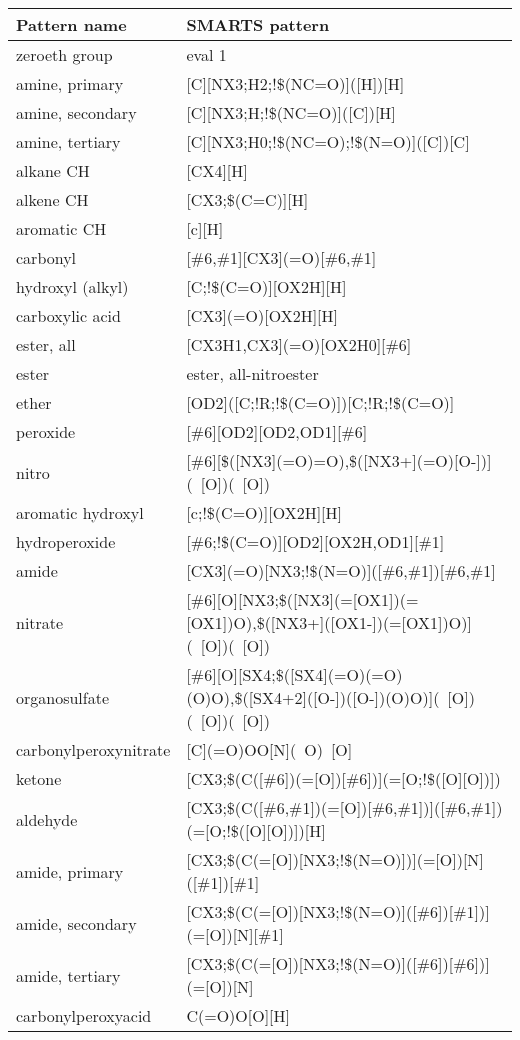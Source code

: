 \begin{tabular}{ll}
\toprule
Pattern name & SMARTS pattern \\
\midrule
zeroeth group & eval 1 \\
amine, primary & [C][NX3;H2;!\$(NC=O)]([H])[H] \\
amine, secondary & [C][NX3;H;!\$(NC=O)]([C])[H] \\
amine, tertiary & [C][NX3;H0;!\$(NC=O);!\$(N=O)]([C])[C] \\
alkane CH & [CX4][H] \\
alkene CH & [CX3;\$(C=C)][H] \\
aromatic CH & [c][H] \\
carbonyl & [\#6,\#1][CX3](=O)[\#6,\#1] \\
hydroxyl (alkyl) & [C;!\$(C=O)][OX2H][H] \\
carboxylic acid & [CX3](=O)[OX2H][H] \\
ester, all & [CX3H1,CX3](=O)[OX2H0][\#6] \\
ester & {ester, all}-{nitroester} \\
ether & [OD2]([C;!R;!\$(C=O)])[C;!R;!\$(C=O)] \\
peroxide & [\#6][OD2][OD2,OD1][\#6] \\
nitro & [\#6][\$([NX3](=O)=O),\$([NX3+](=O)[O-])](~[O])(~[O]) \\
aromatic hydroxyl & [c;!\$(C=O)][OX2H][H] \\
hydroperoxide & [\#6;!\$(C=O)][OD2][OX2H,OD1][\#1] \\
amide & [CX3](=O)[NX3;!\$(N=O)]([\#6,\#1])[\#6,\#1] \\
nitrate & [\#6][O][NX3;\$([NX3](=[OX1])(=[OX1])O),\$([NX3+]([OX1-])(=[OX1])O)](~[O])(~[O]) \\
organosulfate & [\#6][O][SX4;\$([SX4](=O)(=O)(O)O),\$([SX4+2]([O-])([O-])(O)O)](~[O])(~[O])(~[O]) \\
carbonylperoxynitrate & [C](=O)OO[N](~O)~[O] \\
ketone & [CX3;\$(C([\#6])(=[O])[\#6])](=[O;!\$([O][O])]) \\
aldehyde & [CX3;\$(C([\#6,\#1])(=[O])[\#6,\#1])]([\#6,\#1])(=[O;!\$([O][O])])[H] \\
amide, primary & [CX3;\$(C(=[O])[NX3;!\$(N=O)])](=[O])[N]([\#1])[\#1] \\
amide, secondary & [CX3;\$(C(=[O])[NX3;!\$(N=O)]([\#6])[\#1])](=[O])[N][\#1] \\
amide, tertiary & [CX3;\$(C(=[O])[NX3;!\$(N=O)]([\#6])[\#6])](=[O])[N] \\
carbonylperoxyacid & C(=O)O[O][H] \\

\end{tabular}
